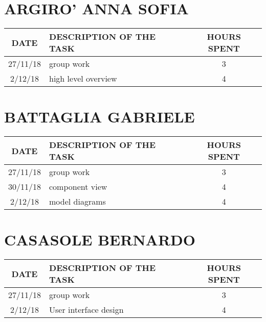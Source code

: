 \section{ARGIRO' ANNA SOFIA}
\begin{table}[h!]
\begin{tabular}{|c|p{3in}|c|}
\hline
\textbf{DATE} &\textbf{DESCRIPTION OF THE TASK} & \textbf{HOURS SPENT}\\
\hline
27/11/18 & group work & 3\\
\hline
2/12/18 & high level overview & 4\\
\hline
\end{tabular}
\end{table}

\clearpage


\section{BATTAGLIA GABRIELE}
\begin{table}[h!]
	\begin{tabular}{|c|p{3in}|c|}
\hline
\textbf{DATE} &\textbf{DESCRIPTION OF THE TASK} & \textbf{HOURS SPENT}\\
\hline
27/11/18 & group work & 3\\
\hline
30/11/18 & component view & 4\\
\hline
2/12/18 & model diagrams & 4\\
\hline
	\end{tabular}
\end{table}

\clearpage

\section{CASASOLE BERNARDO}
\begin{table}[h!]
	\begin{tabular}{|c|p{3in}|c|}
\hline
\textbf{DATE} &\textbf{DESCRIPTION OF THE TASK} & \textbf{HOURS SPENT}\\
\hline
27/11/18 & group work & 3\\
\hline
2/12/18 & User interface design & 4\\
\hline
	\end{tabular}
\end{table}